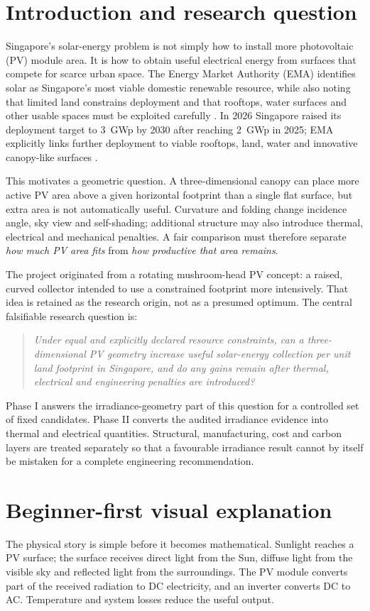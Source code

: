 \documentclass[11pt,a4paper]{article}
\begin{document}
\section{Introduction and research question}
Singapore's solar-energy problem is not simply how to install more photovoltaic (PV) module area. It is how to obtain useful electrical energy from surfaces that compete for scarce urban space. The Energy Market Authority (EMA) identifies solar as Singapore's most viable domestic renewable resource, while also noting that limited land constrains deployment and that rooftops, water surfaces and other usable spaces must be exploited carefully \cite{ema_solar_2026}. In 2026 Singapore raised its deployment target to \SI{3}{\giga\watt}p by 2030 after reaching \SI{2}{\giga\watt}p in 2025; EMA explicitly links further deployment to viable rooftops, land, water and innovative canopy-like surfaces \cite{ema_target_2026}.

This motivates a geometric question. A three-dimensional canopy can place more active PV area above a given horizontal footprint than a single flat surface, but extra area is not automatically useful. Curvature and folding change incidence angle, sky view and self-shading; additional structure may also introduce thermal, electrical and mechanical penalties. A fair comparison must therefore separate \emph{how much PV area fits} from \emph{how productive that area remains}.

The project originated from a rotating mushroom-head PV concept: a raised, curved collector intended to use a constrained footprint more intensively. That idea is retained as the research origin, not as a presumed optimum. The central falsifiable research question is:
\begin{quote}
\emph{Under equal and explicitly declared resource constraints, can a three-dimensional PV geometry increase useful solar-energy collection per unit land footprint in Singapore, and do any gains remain after thermal, electrical and engineering penalties are introduced?}
\end{quote}

Phase I answers the irradiance-geometry part of this question for a controlled set of fixed candidates. Phase II converts the audited irradiance evidence into thermal and electrical quantities. Structural, manufacturing, cost and carbon layers are treated separately so that a favourable irradiance result cannot by itself be mistaken for a complete engineering recommendation.

\section{Beginner-first visual explanation}
The physical story is simple before it becomes mathematical. Sunlight reaches a PV surface; the surface receives direct light from the Sun, diffuse light from the visible sky and reflected light from the surroundings. The PV module converts part of the received radiation to DC electricity, and an inverter converts DC to AC. Temperature and system losses reduce the useful output.
\end{document}
